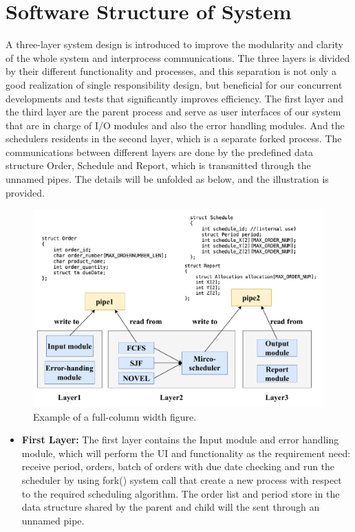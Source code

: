 \documentclass[conference]{IEEEtran}
\begin{document}
\section{\textbf{Software Structure of System}}
A three-layer system design is introduced to improve the modularity and clarity of the whole system and interprocess communications. The three layers is divided by their different functionality and processes, and this separation is not only a good realization of single responsibility design, but beneficial for our concurrent developments and tests that significantly improves efficiency. The first layer and the third layer are the parent process and serve as user interfaces of our system that are in charge of I/O modules and also the error handling modules. And the schedulers residents in the second layer, which is a separate forked process. The communications between different layers are done by the predefined data structure Order, Schedule and Report, which is transmitted through the unnamed pipes. The details will be unfolded as below, and the illustration is provided.

\begin{figure}[htbp]
\centering
\includegraphics[width=0.9\columnwidth]{Figures/1.pdf}
\caption{Example of a full-column width figure.}
\label{fig:ex}
\end{figure}

\begin{itemize}
    \item \textbf{First Layer: } The first layer contains the Input module and error handling module, which will perform the UI and functionality as the requirement need: receive period, orders, batch of orders with due date checking and run the scheduler by using fork() system call that create a new process with respect to the required scheduling algorithm. The order list and period store in the data structure shared by the parent and child will the sent through an unnamed pipe. 
\end{itemize}
\end{document}
